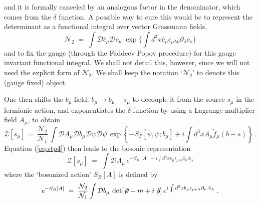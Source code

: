 \documentclass[a4paper,12pt]{article}
\begin{document}
and it is formally canceled by an analogous factor in the denominator,
which comes from the $\delta$ function. A possible way to cure this would
be to represent the determinant as a functional integral over vector
Grassmann fields,
\begin{equation}
  \label{eq:n21}
   {\mathcal N}_2 \;=\; \int {\mathcal D}{\bar c}_\mu {\mathcal
     D}c_\mu \; \exp\{\int d^3x {\bar c}_\mu \epsilon_{\mu\lambda\nu} \partial_\lambda c_\nu \}
\end{equation}
and to fix the gauge (through the Faddeev-Popov procedure) for this
gauge invariant functional integral. We shall not detail this,
however, since we will not need the explicit form of ${\mathcal N}_2$.
We shall keep the notation `${\mathcal N}_2$' to denote this (gauge
fixed) object.

One then shifts the $b_\mu$ field: $b_\mu \to b_\mu - s_\mu$ to decouple it from
the source $s_\mu$ in the fermionic action, and exponentiates the $\delta$
function by using a Lagrange multiplier field $A_\mu$, to obtain
\begin{equation}
  \label{eq:stp4}
  {\mathcal Z}[s_\mu] \,=\,\frac{{\mathcal N}_2}{{\mathcal N}_1}\,
  \int {\mathcal D}A_\mu {\mathcal D}b_\mu {\mathcal D}{\bar\psi}
  {\mathcal D}\psi \,
    \exp \left\{- S_F[{\bar\psi},\psi; b_\mu ] + i \int d^3x A_\mu
    {\tilde f}_\mu(b - s ) \right\} \,.
\end{equation}
Equation (\ref{eq:stp4}) then leads to the bosonic representation
\begin{equation}
 \label{eq:stp5}
  {\mathcal Z}[s_\mu] \;=\; \int {\mathcal D}A_\mu \,
e^{-S_B[A] - i \int d^3x s_\mu \epsilon_{\mu\nu\lambda}\partial_\nu A_\lambda}
\end{equation}
where the `bosonized action' $S_B[A]$ is defined by
\begin{equation}
  \label{eq:stp6}
e^{- S_B[A]} \;=\; \frac{{\mathcal N}_2}{{\mathcal N}_1}
 \int {\mathcal D} b_\mu \,\det[\not\!\partial + m + i \not \! b ]\,
 e^{i\int d^3 x b_\mu \epsilon_{\mu\nu\lambda} \partial_\nu
   A_\lambda} \;.
\end{equation}
\end{document}
